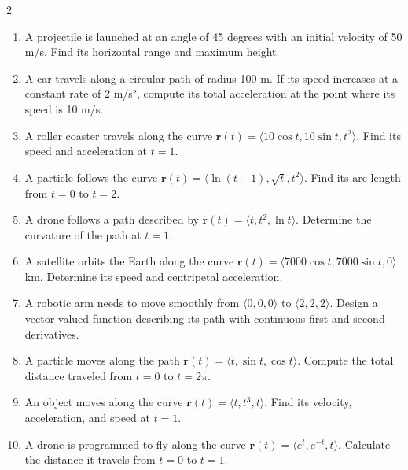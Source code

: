 \begin{multicols}{2}
\begin{enumerate}
    \item A projectile is launched at an angle of 45 degrees with an initial velocity of 50 m/s. Find its horizontal range and maximum height.
    \item A car travels along a circular path of radius 100 m. If its speed increases at a constant rate of 2 m/s², compute its total acceleration at the point where its speed is 10 m/s.
    \item A roller coaster travels along the curve \( \mathbf{r}(t) = \langle 10\cos t, 10\sin t, t^2 \rangle \). Find its speed and acceleration at \( t = 1 \).
    \item A particle follows the curve \( \mathbf{r}(t) = \langle \ln(t+1), \sqrt{t}, t^2 \rangle \). Find its arc length from \( t = 0 \) to \( t = 2 \).
    \item A drone follows a path described by \( \mathbf{r}(t) = \langle t, t^2, \ln t \rangle \). Determine the curvature of the path at \( t = 1 \).
    \item A satellite orbits the Earth along the curve \( \mathbf{r}(t) = \langle 7000\cos t, 7000\sin t, 0 \rangle \) km. Determine its speed and centripetal acceleration.
    \item A robotic arm needs to move smoothly from \( \langle 0, 0, 0 \rangle \) to \( \langle 2, 2, 2 \rangle \). Design a vector-valued function describing its path with continuous first and second derivatives.
    \item A particle moves along the path \( \mathbf{r}(t) = \langle t, \sin t, \cos t \rangle \). Compute the total distance traveled from \( t = 0 \) to \( t = 2\pi \).
    \item An object moves along the curve \( \mathbf{r}(t) = \langle t, t^3, t \rangle \). Find its velocity, acceleration, and speed at \( t = 1 \).
    \item A drone is programmed to fly along the curve \( \mathbf{r}(t) = \langle e^t, e^{-t}, t \rangle \). Calculate the distance it travels from \( t = 0 \) to \( t = 1 \).


\end{enumerate}
\end{multicols}
